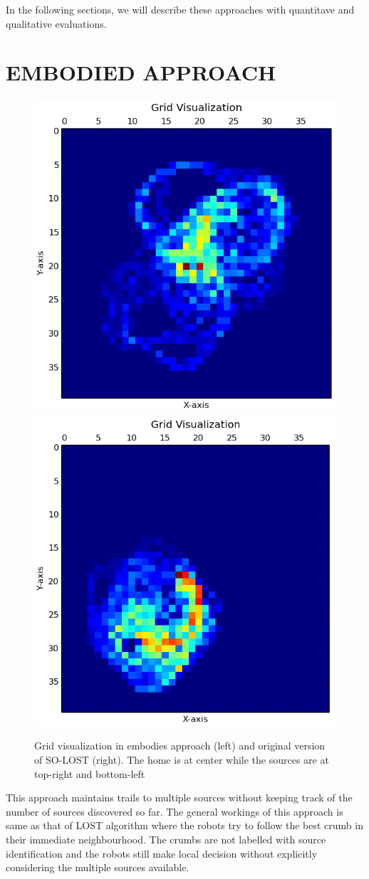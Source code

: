 \documentclass[letterpaper, 10 pt, conference]{ieeeconf}  %
\begin{document}
In the following sections, we will describe these approaches with quantitave and qualitative evaluations.

\section{EMBODIED APPROACH} \label{sec:embodied_approach}

\begin{figure}
   \includegraphics[width=0.49\linewidth]{grid1.png}
   \includegraphics[width=0.49\linewidth]{grid2.png}
   \centering
   \caption{Grid visualization in embodies approach (left) and original version of SO-LOST (right). The home is at center while the sources are at top-right and bottom-left}
   \label{fig:grid_visualization}
\end{figure}

This approach maintains trails to multiple sources without keeping track of the number of sources discovered so far. The general workings of this approach is same as that of LOST algorithm where the robots try to follow the best crumb in their immediate neighbourhood. The crumbs are not labelled with source identification and the robots still make local decision without explicitly considering the multiple sources available. 
\end{document}
